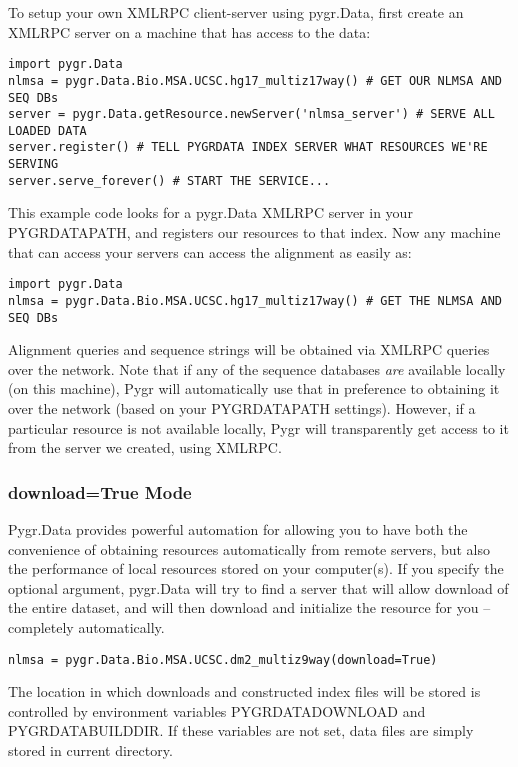 \documentclass{howto}
\begin{document}
To setup your own XMLRPC client-server using pygr.Data,
first create an XMLRPC server on a machine that
has access to the data:

\begin{verbatim}
import pygr.Data
nlmsa = pygr.Data.Bio.MSA.UCSC.hg17_multiz17way() # GET OUR NLMSA AND SEQ DBs
server = pygr.Data.getResource.newServer('nlmsa_server') # SERVE ALL LOADED DATA
server.register() # TELL PYGRDATA INDEX SERVER WHAT RESOURCES WE'RE SERVING
server.serve_forever() # START THE SERVICE...
\end{verbatim}

This example code looks for a pygr.Data XMLRPC server in your PYGRDATAPATH,
and registers our resources to that index.  Now any machine that can access
your servers can access the alignment as easily as:
\begin{verbatim}
import pygr.Data
nlmsa = pygr.Data.Bio.MSA.UCSC.hg17_multiz17way() # GET THE NLMSA AND SEQ DBs
\end{verbatim}
Alignment queries and sequence strings will be obtained via XMLRPC 
queries over the network.  Note that if any of the sequence databases
{\em are} available locally (on this machine), Pygr will automatically use that 
in preference to obtaining it over the network (based on your PYGRDATAPATH
settings).  However, if a particular resource is not available locally,
Pygr will transparently get access to it from the server we created,
using XMLRPC.

\subsubsection{download=True Mode}
Pygr.Data provides powerful automation for allowing you to have
both the convenience of obtaining resources automatically from
remote servers, but also the performance of local resources
stored on your computer(s).  If you specify the optional
 argument, pygr.Data will try to find a 
server that will allow download of the entire dataset, and
will then download and initialize the resource for you --
completely automatically.
\begin{verbatim}
nlmsa = pygr.Data.Bio.MSA.UCSC.dm2_multiz9way(download=True)
\end{verbatim}
The location in which downloads and constructed index files
will be stored is controlled by environment variables
PYGRDATADOWNLOAD and PYGRDATABUILDDIR.  If these variables are
not set, data files are simply stored in current directory.
\end{document}
